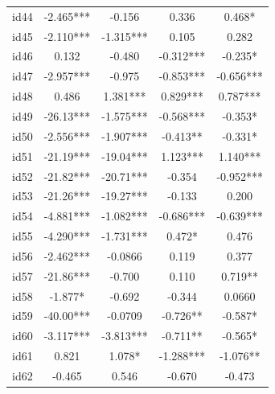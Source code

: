 \documentclass[num-refs]{wiley-article}
\begin{document}
\begin{center}
\begin{longtable}{ccccc}
id44                     & -2.465*** & -0.156         & 0.336             & 0.468*            \\
id45                     & -2.110*** & -1.315***      & 0.105             & 0.282             \\
id46                     & 0.132     & -0.480         & -0.312***         & -0.235*           \\
id47                     & -2.957*** & -0.975         & -0.853***         & -0.656***         \\
id48                     & 0.486     & 1.381***       & 0.829***          & 0.787***          \\
id49                     & -26.13*** & -1.575***      & -0.568***         & -0.353*           \\
id50                     & -2.556*** & -1.907***      & -0.413**          & -0.331*           \\
id51                     & -21.19*** & -19.04***      & 1.123***          & 1.140***          \\
id52                     & -21.82*** & -20.71***      & -0.354            & -0.952***         \\
id53                     & -21.26*** & -19.27***      & -0.133            & 0.200             \\
id54                     & -4.881*** & -1.082***      & -0.686***         & -0.639***         \\
id55                     & -4.290*** & -1.731***      & 0.472*            & 0.476             \\
id56                     & -2.462*** & -0.0866        & 0.119             & 0.377             \\
id57                     & -21.86*** & -0.700         & 0.110             & 0.719**           \\
id58                     & -1.877*   & -0.692         & -0.344            & 0.0660            \\
id59                     & -40.00*** & -0.0709        & -0.726**          & -0.587*           \\
id60                     & -3.117*** & -3.813***      & -0.711**          & -0.565*           \\
id61                     & 0.821     & 1.078*         & -1.288***         & -1.076**          \\
id62                     & -0.465    & 0.546          & -0.670            & -0.473            \\

\end{longtable}
\end{center}
\end{document}

